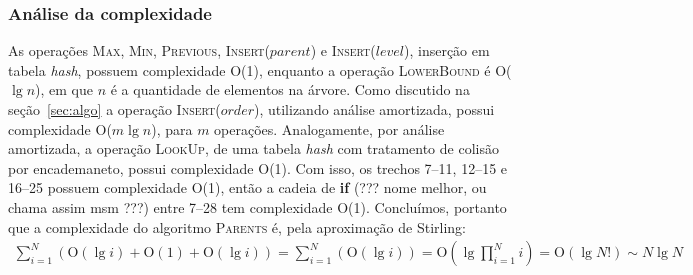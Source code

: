\subsubsection{Análise da complexidade}
As operações \textsc{Max}, \textsc{Min}, \textsc{Previous},
\textsc{Insert}($parent$) e \textsc{Insert}($level$), inserção em tabela
\textit{hash}, possuem complexidade O(1), enquanto a operação
\textsc{LowerBound} é O($\lg n$), em que $n$ é a quantidade de elementos na árvore. Como discutido na seção~\ref{sec:algo}
a operação \textsc{Insert}($order$), utilizando análise amortizada, possui
complexidade O($m \lg n$), para $m$ operações. Analogamente, por análise amortizada, a operação
\textsc{LookUp}, de uma tabela \textit{hash} com tratamento de colisão por
encademaneto, possui complexidade O(1). Com isso, os trechos 7--11, 12--15 e
16--25 possuem complexidade O(1), então a cadeia de \textbf{if} (??? nome
melhor, ou chama assim msm ???) entre 7--28 tem complexidade O(1). Concluímos,
portanto que a complexidade do algoritmo \textsc{Parents} é, pela aproximação de
Stirling:
\begin{align*}
  \sum_{i = 1}^{N}(\text{O}(\lg i) + \text{O}(1) + \text{O}(\lg i)) = \sum_{i = 1}^{N}(\text{O}(\lg i)) = \text{O}(\lg \prod_{i = 1}^{N} i) = \text{O}(\lg N!) \sim N \lg N
\end{align*}